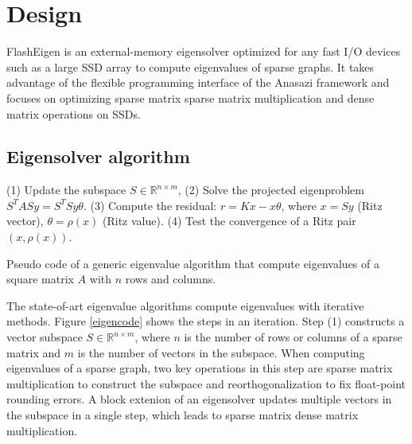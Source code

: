\section{Design}
FlashEigen is an external-memory eigensolver optimized for any fast I/O devices
such as a large SSD array to compute eigenvalues of sparse graphs. It takes
advantage of the flexible programming interface of the Anasazi framework and
focuses on optimizing sparse matrix sparse matrix multiplication and dense
matrix operations on SSDs.

\subsection{Eigensolver algorithm}


\begin{algorithm}
	\begin{algorithmic}[1]
		\State (1) Update the subspace $S \in \mathbb{R}^{n \times m}$,
		\State (2) Solve the projected eigenproblem $S^TASy = S^TSy\theta$.
		\State (3) Compute the residual: $r = Kx - x\theta$, where
		\State\hspace{\algorithmicindent} $x = Sy$ (Ritz vector), $\theta = \rho(x)$ (Ritz value).
		\State (4) Test the convergence of a Ritz pair $(x, \rho(x))$.
		\EndFor
	\end{algorithmic}
	\caption{Pseudo code of a generic eigenvalue algorithm that compute eigenvalues
	of a square matrix $A$ with $n$ rows and columns.}
	\label{eigencode}
\end{algorithm}

The state-of-art eigenvalue algorithms compute eigenvalues with iterative
methods. Figure \ref{eigencode} shows the steps in an iteration.
Step (1) constructs a vector subspace $S \in \mathbb{R}^{n \times m}$, where
$n$ is the number of rows or columns of a sparse matrix and $m$ is the number
of vectors in the subspace. When computing eigenvalues of a sparse graph,
two key operations in this step are sparse matrix multiplication to construct
the subspace and reorthogonalization to fix float-point rounding errors.
A block extenion of an eigensolver updates multiple vectors in the subspace
in a single step, which leads to sparse matrix dense matrix multiplication.

